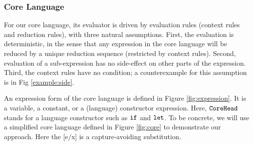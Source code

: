 \subsubsection{Core Language}


For our core language,  its evaluator is driven by evaluation rules (context rules and reduction rules), with three natural assumptions. First, the evaluation is deterministic, in the sense that any expression in the core language will be reduced by a unique reduction sequence (restricted by context rules). Second, evaluation of a sub-expression has no side-effect on other parts of the expression. Third, the context rules have no condition; a counterexample for this assumption is in Fig \ref{example:side}.



An expression form of the core language is defined in Figure \ref{fig:expression}. It is a variable, a constant, or a (language) constructor expression. Here, $\mbox{\tt CoreHead}$ stands for a language constructor such as $\mbox{\tt if}$ and $\mbox{\tt let}$. To be concrete, we will use a simplified core language defined in Figure \ref{fig:core} to demonstrate our approach. Here the [e/x] is a capture-avoiding substitution.

